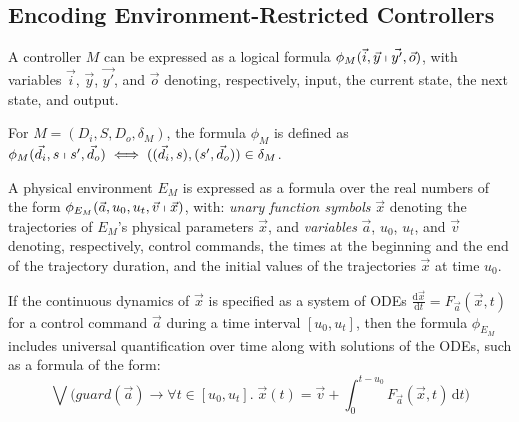 \subsection{Encoding Environment-Restricted Controllers}
\label{sec:discrete-encoding}

A controller $M$ can be 
expressed as a logical formula %
$\phi_M(\vec{i}, \vec{y} \shortmid \vec{y'}, \vec{o})$,
with variables
$\vec{i}$, $\vec{y}$, $\vec{y'}$, and $\vec{o}$  denoting,
respectively,  input, 
 the current state, 
 the next state, and output.

\begin{definition}
For  $M = (D_i,S,D_o,\delta_M)$,
the formula $\phi_M$ is defined as
$\phi_{M}(\vec{d}_i, s \shortmid s',  \vec{d}_o)
\iff
( (\vec{d}_i, s), (s', \vec{d}_o) ) \in \delta_{M}$.
\end{definition}



A physical environment $E_M$ is expressed as 
a formula over the real numbers %
of the form $\phi_{E_M}(\vec{a},u_0,u_t,\vec{v} \shortmid \vec{x})$,
with: \emph{unary function symbols} $\vec{x}$ denoting the
trajectories of $E_M$'s physical parameters $\vec{x}$, and 
	\emph{variables} $\vec{a}$, $u_0$, $u_t$, and $\vec{v}$
        denoting, respectively,  control commands, %
		 the 
		times at the beginning and the end of the trajectory duration, and 
		the  initial values of the trajectories $\vec{x}$ at time $u_0$.


If the continuous dynamics of $\vec{x}$ is specified as a system of ODEs
$\frac{\mathrm{d}\vec{x}}{\mathrm{d}t}= F_{\vec{a}}(\vec{x},t)$
for a control command $\vec{a}$
during a time interval $[u_0,u_t]$, 
then the formula $\phi_{E_M}$ 
includes universal quantification over time along with solutions of the ODEs, such as a formula of the form:
\[
\bigvee \big(\mathit{guard}(\vec{a}) \rightarrow
\forall t \in [u_0,u_t].\;
\vec{x}(t) = \vec{v} + \int_0^{t-u_0} \!  F_{\vec{a}}(\vec{x},t)\,\mathrm{d}t
\big)
\]


